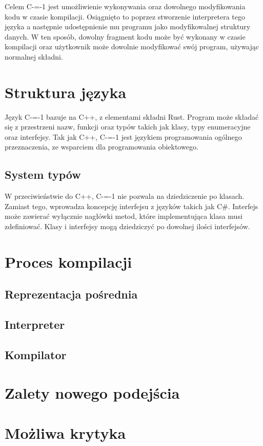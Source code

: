 \documentclass[conference]{IEEEtran}
\begin{document}
Celem C-=-1 jest umożliwienie wykonywania oraz dowolnego modyfikowania kodu w czasie kompilacji.
Osiągnięto to poprzez stworzenie interpretera tego języka a następnie udostępnienie mu programu jako modyfikowalnej struktury danych.
W ten sposób, dowolny fragment kodu może być wykonany w czasie kompilacji oraz użytkownik może dowolnie modyfikować swój program, używając normalnej składni.

\section{Struktura języka}

Język C-=-1 bazuje na C++, z elementami składni Rust.
Program może składać się z przestrzeni nazw, funkcji oraz typów takich jak klasy, typy enumeracyjne oraz interfejsy.
Tak jak C++, C-=-1 jest językiem programowania ogólnego przeznaczenia, ze wsparciem dla programowania obiektowego.

\subsection{System typów}
W przeciwieństwie do C++, C-=-1 nie pozwala na dziedziczenie po klasach.
Zamiast tego, wprowadza koncepcję interfejsu z języków takich jak C\#.
Interfejs może zawierać wyłącznie nagłówki metod, które implementująca klasa musi zdefiniować.
Klasy i interfejsy mogą dziedziczyć po dowolnej ilości interfejsów.

\section{Proces kompilacji}

\subsection{Reprezentacja pośrednia}

\subsection{Interpreter}
\subsection{Kompilator}
\section{Zalety nowego podejścia}
\section{Możliwa krytyka}
\end{document}
